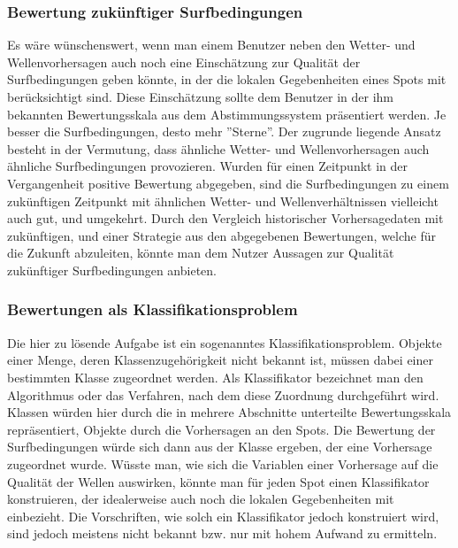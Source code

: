 \subsubsection{Bewertung zukünftiger Surfbedingungen}
Es wäre wünschenswert, wenn man einem Benutzer neben den Wetter- und
Wellenvorhersagen auch noch eine Einschätzung zur Qualität der
Surfbedingungen geben könnte, in der die lokalen Gegebenheiten eines
Spots mit berücksichtigt sind. Diese Einschätzung sollte dem Benutzer
in der ihm bekannten Bewertungsskala aus dem Abstimmungssystem
präsentiert werden. Je besser die Surfbedingungen, desto mehr
''Sterne''. Der zugrunde liegende Ansatz besteht in der Vermutung,
dass ähnliche Wetter- und Wellenvorhersagen auch ähnliche
Surfbedingungen provozieren. Wurden für einen Zeitpunkt in der
Vergangenheit positive Bewertung abgegeben, sind die Surfbedingungen
zu einem zukünftigen Zeitpunkt mit ähnlichen Wetter- und
Wellenverhältnissen vielleicht auch gut, und umgekehrt. Durch den
Vergleich historischer Vorhersagedaten mit zukünftigen, und einer
Strategie aus den abgegebenen Bewertungen, welche für die Zukunft
abzuleiten, könnte man dem Nutzer Aussagen zur Qualität zukünftiger
Surfbedingungen anbieten.

\subsubsection{Bewertungen als Klassifikationsproblem}
Die hier zu lösende Aufgabe ist ein sogenanntes
Klassifikationsproblem. Objekte einer Menge, deren
Klassenzugehörigkeit nicht bekannt ist, müssen dabei einer bestimmten
Klasse zugeordnet werden. Als Klassifikator bezeichnet man den
Algorithmus oder das Verfahren, nach dem diese Zuordnung durchgeführt
wird. Klassen würden hier durch die in mehrere Abschnitte unterteilte
Bewertungsskala repräsentiert, Objekte durch die Vorhersagen an den
Spots. Die Bewertung der Surfbedingungen würde sich dann aus der
Klasse ergeben, der eine Vorhersage zugeordnet wurde. Wüsste man, wie
sich die Variablen einer Vorhersage auf die Qualität der Wellen
auswirken, könnte man für jeden Spot einen Klassifikator konstruieren,
der idealerweise auch noch die lokalen Gegebenheiten mit
einbezieht. Die Vorschriften, wie solch ein Klassifikator jedoch
konstruiert wird, sind jedoch meistens nicht bekannt bzw. nur mit
hohem Aufwand zu ermitteln.

